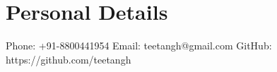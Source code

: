 \documentclass[a4paper,12pt]{article}
\begin{document}
\section*{Personal Details}
Phone: +91-8800441954
\newline
Email: teetangh@gmail.com
\newline
GitHub: https://github.com/teetangh

\end{document}
